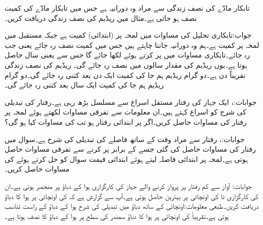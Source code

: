 تابکار مادّے کی نصف زندگی  سے مراد وہ دورانیہ ہے جس میں تابکار مادّے کی کمیت نصف ہو جاتی ہے۔مثال  میں ریڈیم  کی نصف زندگی دریافت کریں۔

جواب:تابکاری تحلیل کی مساوات  میں لمحہ  پر (ابتدائی) کمیت ہے جبکہ مستقبل میں لمحہ  پر کمیت  ہے۔ہم وہ دورانیہ جاننا چاہتے ہیں جس میں کمیت نصف رہ جائے یعنی جب  رہ جائے۔تابکاری مساوات میں  پر کرتے ہوئے  لکھا جائے گا جس سے   یعنی  سال  حاصل ہوتا ہے۔یوں ریڈیم کی مقدار  سالوں میں نصف رہ جائے گی۔ 
ریڈیم   کی نصف زندگی تقریباً  دن ہے۔دو گرام  ریڈیم ہم جا کی کمیت ایک دن بعد کتنی رہ جائے گی۔دو گرام ریڈیم ہم جا کی کمیت ایک سال بعد کتنی رہ جائے گی۔

جوابات:، 
ایک جہاز کی رفتار مستقل اسراع  سے مسلسل بڑھ رہی ہے۔رفتار کی تبدیلی کی شرح  کو اسراع کہتے ہیں۔ان معلومات سے تفرقی مساوات لکھتے ہوئے لمحہ  پر رفتار  کی مساوات حاصل کریں۔اگر  پر ابتدائی رفتار  ہو تب  کی مساوات کیا ہو گی؟ 

جوابات:، 
رفتار سے مراد وقت کے ساتھ فاصلے کی تبدیلی کی شرح  ہے۔سوال  میں رفتار کی مساوات  حاصل کی گئی جسے  کے برابر پر کرنے سے تفرقی مساوات حاصل ہوتی ہے۔لمحہ  پر ابتدائی فاصلہ  لیتے ہوئے ابتدائی قیمت سوال کو حل کرتے ہوئے   کی مساوات حاصل کریں۔

جوابات:
آواز سے کم رفتار پر پرواز کرنے والے جہاز کی کارگزاری ہوا کے دباؤ پر منحصر ہوتی ہے۔ان  کی کارگزاری  تا  کی اونچائی پر بہترین حاصل ہوتی ہے۔آپ سے گزارش ہے کہ  کی اونچائی پر ہوا کا دباؤ دریافت کریں۔طبعی معلومات:اونچائی کے ساتھ دباؤ میں تبدیلی کی شرح  ہوا کے دباؤ  کے راست تناسب ہوتی ہے۔تقریباً  کی اونچائی پر ہوا کا دباؤ سمندر کی سطح پر ہوا کے دباؤ  کا نصف ہوتا ہے۔

